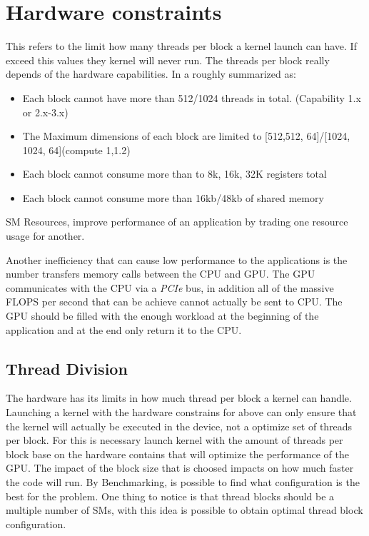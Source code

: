 \section{Hardware constraints}

This refers to the limit how many threads per block a kernel launch can have. If exceed this values they kernel will never run. The threads per block really depends of the hardware capabilities. In a roughly summarized as:

\begin{itemize}
\item Each block cannot have more than 512/1024 threads in total. (Capability 1.x or 2.x-3.x)
\item The Maximum dimensions of each block are limited to [512,512, 64]/[1024, 1024, 64](compute 1,1.2)
\item Each block cannot consume more than to 8k, 16k, 32K registers total
\item Each block cannot consume more than 16kb/48kb of shared memory
\end{itemize}

SM Resources, improve performance of an application by trading one resource usage for another.  \cite{practices}

Another inefficiency that can cause low performance to the applications is the number transfers memory calls between the CPU and GPU. The GPU communicates with the CPU via a \textit{PCIe} bus, in addition all of the massive FLOPS per second that can be achieve cannot actually be sent to CPU. The GPU should be filled with the enough workload at the beginning of the application and at the end only return it to the CPU.

\subsection{Thread Division}

The hardware has its limits in how much thread per block a kernel can handle. Launching a kernel with the hardware constrains for above can only ensure that the kernel will actually be executed in the device, not a optimize set of threads per block. For this is necessary launch kernel with the amount of threads per block base on the hardware contains that will optimize the performance of the GPU. The impact of the block size that is choosed impacts on how much faster the code will run. By Benchmarking, is possible to find what configuration is the best for the problem. One thing to notice is that thread blocks should be a multiple number of SMs, with this idea is possible to obtain optimal thread block configuration.

